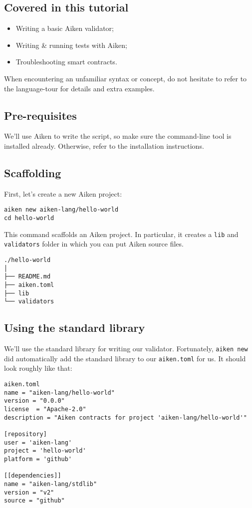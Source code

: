 \subsection{Covered in this tutorial}
\begin{itemize}
    \item Writing a basic Aiken validator;
    \item Writing \& running tests with Aiken;
    \item Troubleshooting smart contracts.
\end{itemize}

When encountering an unfamiliar syntax or concept, do not hesitate to refer to the language-tour for details and extra examples.

\subsection{Pre-requisites}
We'll use Aiken to write the script, so make sure the command-line tool is installed already. Otherwise, refer to the installation instructions.

\subsection{Scaffolding}
First, let's create a new Aiken project:

\begin{verbatim}
aiken new aiken-lang/hello-world
cd hello-world
\end{verbatim}

This command scaffolds an Aiken project. In particular, it creates a \texttt{lib} and \texttt{validators} folder in which you can put Aiken source files.

\begin{verbatim}
./hello-world
│
├── README.md
├── aiken.toml
├── lib
└── validators
\end{verbatim}

\subsection{Using the standard library}
We'll use the standard library for writing our validator. Fortunately, \texttt{aiken new} did automatically add the standard library to our \texttt{aiken.toml} for us. It should look roughly like that:

\begin{verbatim}
aiken.toml
name = "aiken-lang/hello-world"
version = "0.0.0"
license  = "Apache-2.0"
description = "Aiken contracts for project 'aiken-lang/hello-world'"
 
[repository]
user = 'aiken-lang'
project = 'hello-world'
platform = 'github'
 
[[dependencies]]
name = "aiken-lang/stdlib"
version = "v2"
source = "github"
\end{verbatim}

